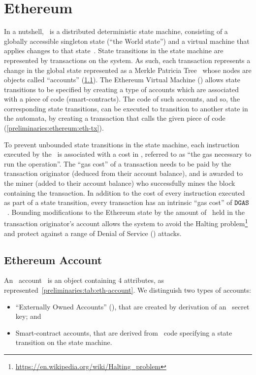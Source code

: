 
\section{Ethereum}\label{preliminaries:ethereum}

In a nutshell, \ethereum~is a distributed deterministic state machine, consisting of a globally accessible singleton state (``the World state'') and a virtual machine that applies changes to that state~\cite{mastering-eth}.
State transitions in the state machine are represented by transactions on the system. As such, each transaction represents a change in the global state represented as a Merkle Patricia Tree~\cite{patricia-tree} whose nodes are objects called ``accounts'' (\cref{preliminaries:ethereum:eth-account}). The Ethereum Virtual Machine (\evm) allows state transitions to be specified by creating a type of accounts which are associated with a piece of code (smart-contracts). The code of such accounts, and so, the corresponding state transitions, can be executed to transition to another state in the automata, by creating a transaction that calls the given piece of code (\cref{preliminaries:ethereum:eth-tx}).

To prevent unbounded state transitions in the state machine, each instruction executed by the \evm~is associated with a cost in \wei, referred to as ``the gas necessary to run the operation''. The ``gas cost'' of a transaction needs to be paid by the transaction originator (deduced from their account balance), and is awarded to the miner (added to their account balance) who successfully mines the block containing the transaction.
In addition to the cost of every instruction executed as part of a state transition, every transaction has an intrinsic ``gas cost'' of $\mathtt{DGAS}$ \wei~\cite[Appendix G]{ethyellowpaper}. Bounding modifications to the Ethereum state by the amount of \wei~held in the transaction originator's account allows the system to avoid the Halting problem\footnote{\url{https://en.wikipedia.org/wiki/Halting\_problem}} and protect against a range of Denial of Service (\dos) attacks.

\subsection{Ethereum Account}\label{preliminaries:ethereum:eth-account}

An \ethereum~account~\cite[Section 4.1]{ethyellowpaper} is an object containing 4 attributes, as represented~\cref{preliminaries:tab:eth-account}.
We distinguish two types of accounts:
\begin{itemize}
    \item ``Externally Owned Accounts'' (\eoa), that are created by derivation of an \ecdsa~secret key; and
    \item Smart-contract accounts, that are derived from \evm~code specifying a state transition on the state machine.
\end{itemize}

